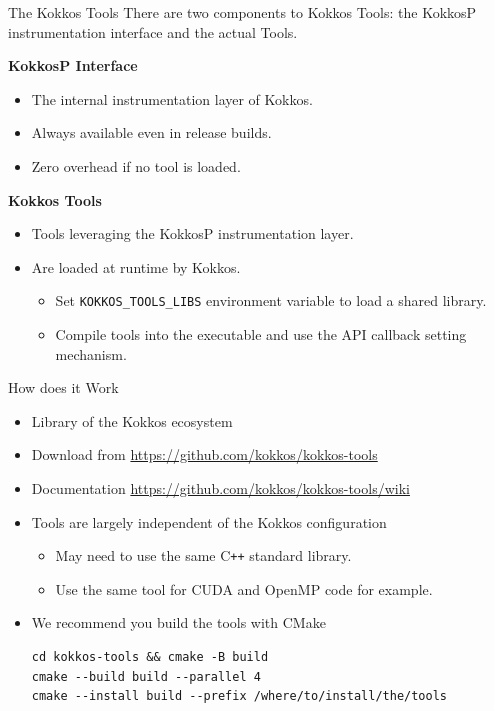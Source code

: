 \begin{frame}[fragile]{The Kokkos Tools}
  There are two components to Kokkos Tools: the KokkosP instrumentation interface and the actual Tools.

  \vspace{10pt}
  \textbf{KokkosP Interface}

  \begin{itemize}
    \item The internal instrumentation layer of Kokkos.
    \item Always available even in release builds.
    \item Zero overhead if no tool is loaded.
  \end{itemize}

  \vspace{5pt}
  \textbf{Kokkos Tools}
  \begin{itemize}
    \item Tools leveraging the KokkosP instrumentation layer.
    \item Are loaded at runtime by Kokkos.
    \begin{itemize}
      \item Set \texttt{KOKKOS\_TOOLS\_LIBS} environment variable to load a shared library.
      \item Compile tools into the executable and use the API callback setting mechanism.
    \end{itemize}
  \end{itemize}
\end{frame}


\begin{frame}[fragile]{How does it Work}
\begin{itemize}
    \item Library of the Kokkos ecosystem
    \item Download from \url{https://github.com/kokkos/kokkos-tools}
    \item Documentation \url{https://github.com/kokkos/kokkos-tools/wiki}
\end{itemize}

\begin{itemize}
  \item Tools are largely independent of the Kokkos configuration
    \begin{itemize}
      \item May need to use the same C\texttt{++} standard library.
      \item Use the same tool for CUDA and OpenMP code for example.
     \end{itemize}
  \item We recommend you build the tools with CMake
\begin{verbatim}
cd kokkos-tools && cmake -B build
cmake --build build --parallel 4
cmake --install build --prefix /where/to/install/the/tools
\end{verbatim}
\end{itemize}

\end{frame}

